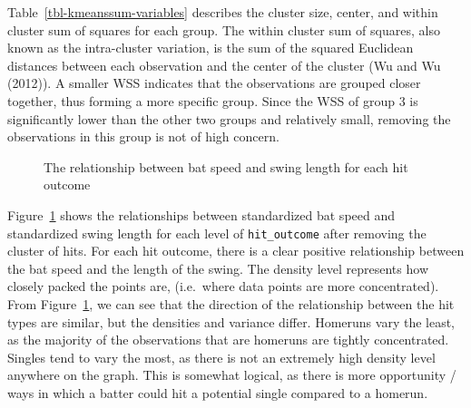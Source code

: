 \documentclass[
  letterpaper,
  DIV=11,
  numbers=noendperiod]{scrartcl}
\begin{document}
Table~\ref{tbl-kmeanssum-variables} describes the cluster size, center,
and within cluster sum of squares for each group. The within cluster sum
of squares, also known as the intra-cluster variation, is the sum of the
squared Euclidean distances between each observation and the center of
the cluster (Wu and Wu (2012)). A smaller WSS indicates that the
observations are grouped closer together, thus forming a more specific
group. Since the WSS of group 3 is significantly lower than the other
two groups and relatively small, removing the observations in this group
is not of high concern.

\begin{figure}[H]


\caption{\label{fig-no-b-den}The relationship between bat speed and
swing length for each hit outcome}

\end{figure}%

Figure~\ref{fig-no-b-den} shows the relationships between standardized
bat speed and standardized swing length for each level of
\texttt{hit\_outcome} after removing the cluster of hits. For each hit
outcome, there is a clear positive relationship between the bat speed
and the length of the swing. The density level represents how closely
packed the points are, (i.e.~where data points are more concentrated).
From Figure~\ref{fig-no-b-den}, we can see that the direction of the
relationship between the hit types are similar, but the densities and
variance differ. Homeruns vary the least, as the majority of the
observations that are homeruns are tightly concentrated. Singles tend to
vary the most, as there is not an extremely high density level anywhere
on the graph. This is somewhat logical, as there is more opportunity /
ways in which a batter could hit a potential single compared to a
homerun.
\end{document}
